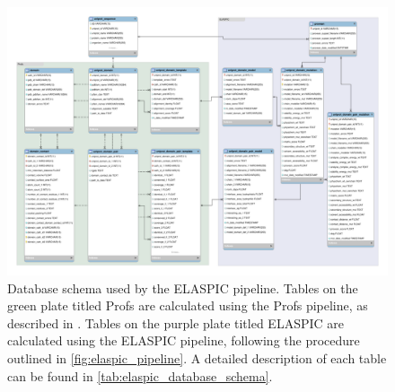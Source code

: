 \begin{figure}[ht]
	\centering
	\includegraphics[width=1.0\textwidth]{static/elaspic/elaspic_schema.pdf}
	\caption{Database schema used by the ELASPIC pipeline. Tables on the green plate titled Profs are calculated using the Profs pipeline, as described in \cite{witvliet_elaspic_2016}. Tables on the purple plate titled ELASPIC are calculated using the ELASPIC pipeline, following the procedure outlined in \ref{fig:elaspic_pipeline}. A detailed description of each table can be found in \ref{tab:elaspic_database_schema}.}
    \label{fig:elaspic_database_schema}
\end{figure}


